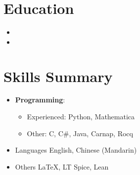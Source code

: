 \documentclass{curriculum-vitae}
\author{Ian Chi}
\begin{document}
\maketitle

\section{Education}
\begin{itemize}
    \item
    \item
    {}
\end{itemize}

\section{Skills Summary}
\begin{itemize}
    \item
        \textbf{Programming}:

        \begin{itemize}
            \item Experienced: Python, Mathematica 
    
            \item Other: C, C\#, Java, Carnap, Rocq
        \end{itemize}

    \item
    \begin{itemshortlist}{Languages}
        English, Chinese (Mandarin)
    \end{itemshortlist}

    \item
    \begin{itemshortlist}{Others}
        \LaTeX, LT Spice, Lean
    \end{itemshortlist}
\end{itemize}
\end{document}
